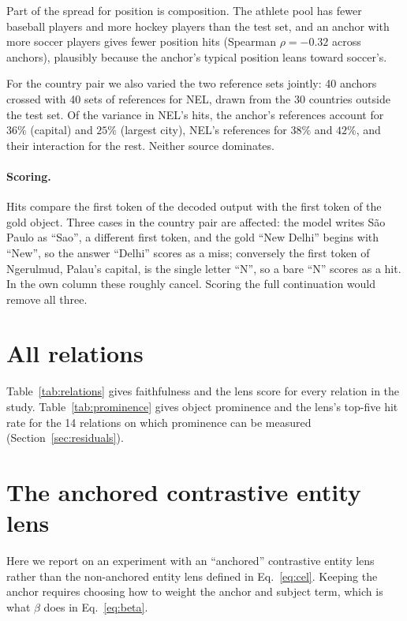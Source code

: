 \documentclass{article}
\begin{document}
Part of the spread for position is composition. The athlete pool has
fewer baseball players and more hockey players than the test set, and an
anchor with more soccer players gives fewer position hits (Spearman
$\rho = -0.32$ across anchors), plausibly because the anchor's typical
position leans toward soccer's.

For the country pair we also varied the two reference sets jointly: 40
anchors crossed with 40 sets of references for NEL, drawn from the 30
countries outside the test set. Of the variance in NEL's hits, the
anchor's references account for $36\%$ (capital) and $25\%$ (largest
city), NEL's references for $38\%$ and $42\%$, and their interaction for
the rest. Neither source dominates.

\paragraph{Scoring.} Hits compare the first token of the decoded output
with the first token of the gold object. Three cases in the country pair
are affected: the model writes S\~{a}o Paulo as ``Sao'', a different
first token, and the gold ``New Delhi'' begins with ``New'', so the
answer ``Delhi'' scores as a miss; conversely the first token of
Ngerulmud, Palau's capital, is the single letter ``N'', so a bare ``N''
scores as a hit. In the own column these roughly cancel. Scoring the full
continuation would remove all three.

\section{All relations}

Table~\ref{tab:relations} gives faithfulness and the lens score for every
relation in the study. Table~\ref{tab:prominence} gives object prominence
and the lens's top-five hit rate for the 14 relations on which prominence
can be measured (Section~\ref{sec:residuals}).




\section{The anchored contrastive entity lens}
Here we report on an experiment with an ``anchored''
contrastive entity lens rather than the non-anchored
entity lens defined in Eq.~\ref{eq:cel}.
Keeping the anchor requires choosing how to weight the anchor and subject
term, which is what $\beta$ does in Eq.~\ref{eq:beta}.
\end{document}
